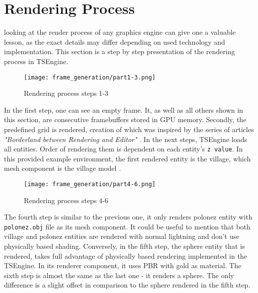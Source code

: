 \newpage
\section{Rendering Process}
\label{sec:rendering_process}
\hspace{\parindent}
looking at the render process of any graphics engine can give one a valuable lesson, as the exact details may differ depending on used technology and implementation. This section is a step by step presentation of the rendering process in TSEngine.\\
\begin{figure}[H]
  \texttt{[image: frame\_generation/part1-3.png]}
  \caption{Rendering process steps 1-3}
\end{figure}
In the first step, one can see an empty frame. It, as well as all others shown in this section, are consecutive framebuffers stored in GPU memory.
Secondly, the predefined grid is rendered, creation of which was inspired by the series of articles \textit{"Borderland between Rendering and Editor"} \cite{GridRendering}.
In the next steps, TSEngine loads all entities. Order of rendering them is dependent on each entity's \texttt{z value}. In this provided example environment, the first rendered entity is the village, which mesh component is the village model \cite{VillageModel}.

\begin{figure}[H]
  \texttt{[image: frame\_generation/part4-6.png]}
  \caption{Rendering process steps 4-6}
\end{figure}
The fourth step is similar to the previous one, it only renders polonez entity with \texttt{polonez.obj} \cite{PolonezModel} file as its mesh component. It could be useful to mention that both village and polonez entities are rendered with normal lightning and don't use physically based shading.
Conversely, in the fifth step, the sphere entity that is rendered, takes full advantage of physically based rendering implemented in the TSEngine. In its renderer component, it uses PBR with gold as material. 
The sixth step is almost the same as the last one - it renders a sphere. The only difference is a slight offset in comparison to the sphere rendered in the fifth step.

